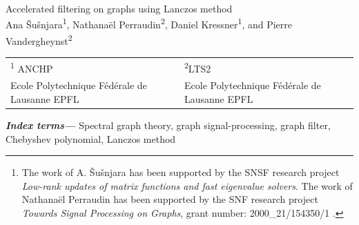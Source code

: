 \documentclass{article}
\newcommand\Mark[1]{\textsuperscript#1}
\providecommand{\keywords}[1]{\textbf{\textit{Index terms---}} #1}
\begin{document}

\begingroup
\centering
{\LARGE Accelerated filtering on graphs using Lanczos method\\[1.5em]
\large Ana {\v S}u{\v s}njara\Mark{1}, Nathanaël Perraudin\Mark{2}, Daniel Kressner\Mark{1}, and
Pierre Vandergheynst\Mark{2}}\\[1em]
\begin{tabular}{*{2}{>{\centering}p{}}}
 \Mark{1} ANCHP & \Mark{2}LTS2 \tabularnewline
Ecole Polytechnique Fédérale de Lausanne
EPFL & Ecole Polytechnique Fédérale de Lausanne
EPFL  \tabularnewline
\end{tabular}\par
\endgroup

%



\begin{abstract}
Signal-processing on graphs has developed into a very active field of research during the last decade.
In particular, the number of applications using frames constructed from graphs, like wavelets on graphs, has substantially increased. To attain scalability for large graphs, fast graph-signal filtering techniques are needed. 
In this contribution, we propose an accelerated algorithm based on the Lanczos method that adapts to the Laplacian spectrum without explicitly computing it. The result is an accurate, robust, scalable and efficient algorithm. 
Compared to existing methods based on Chebyshev polynomials, our solution achieves higher accuracy without increasing the overall complexity significantly. Furthermore, it is particularly well suited for graphs with large spectral gaps.
\footnote{The work of A. {\v S}u{\v s}njara has been supported by the SNSF research project \textit{Low-rank updates of matrix functions and fast eigenvalue solvers}. The work of Nathanaël Perraudin has been supported by the SNF research project \textit{Towards Signal Processing on Graphs}, grant number: 2000\_21/154350/1 .}

\end{abstract}
\keywords{
Spectral graph theory, graph signal-processing, graph filter, Chebyshev polynomial, Lanczos method
}
\end{document}
